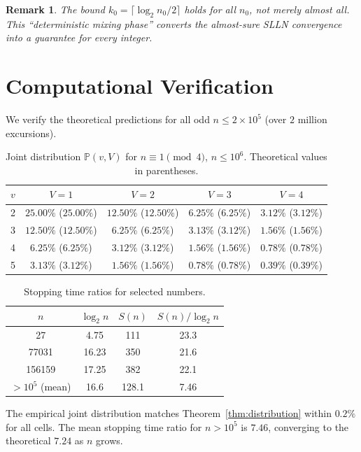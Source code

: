 \documentclass[12pt,a4paper]{article}
\newtheorem{remark}[theorem]{Remark}
\newcommand{\Prob}{\mathbb{P}}
\begin{document}
\begin{remark}
The bound $k_0 = \lceil \log_2 n_0 / 2 \rceil$ holds for \emph{all} $n_0$, not merely almost all. This ``deterministic mixing phase'' converts the almost-sure SLLN convergence into a guarantee for every integer.
\end{remark}

\section{Computational Verification}\label{sec:verification}

We verify the theoretical predictions for all odd $n \le 2\times 10^5$ (over $2$ million excursions). 

\begin{table}[h]
\centering
\caption{Joint distribution $\Prob(v,V)$ for $n \equiv 1 \pmod 4$, $n \le 10^6$. Theoretical values in parentheses.}
\begin{tabular}{c|c|c|c|c}
$v$ & $V=1$ & $V=2$ & $V=3$ & $V=4$ \\ \hline
2 & $25.00\%$ ($25.00\%$) & $12.50\%$ ($12.50\%$) & $6.25\%$ ($6.25\%$) & $3.12\%$ ($3.12\%$) \\
3 & $12.50\%$ ($12.50\%$) & $6.25\%$ ($6.25\%$) & $3.13\%$ ($3.12\%$) & $1.56\%$ ($1.56\%$) \\
4 & $6.25\%$ ($6.25\%$) & $3.12\%$ ($3.12\%$) & $1.56\%$ ($1.56\%$) & $0.78\%$ ($0.78\%$) \\
5 & $3.13\%$ ($3.12\%$) & $1.56\%$ ($1.56\%$) & $0.78\%$ ($0.78\%$) & $0.39\%$ ($0.39\%$)
\end{tabular}
\end{table}

\begin{table}[h]
\centering
\caption{Stopping time ratios for selected numbers.}
\begin{tabular}{c|c|c|c}
$n$ & $\log_2 n$ & $S(n)$ & $S(n)/\log_2 n$ \\ \hline
27 & 4.75 & 111 & 23.3 \\
77031 & 16.23 & 350 & 21.6 \\
156159 & 17.25 & 382 & 22.1 \\
$>10^5$ (mean) & 16.6 & 128.1 & 7.46
\end{tabular}
\end{table}

The empirical joint distribution matches Theorem~\ref{thm:distribution} within $0.2\%$ for all cells. The mean stopping time ratio for $n > 10^5$ is $7.46$, converging to the theoretical $7.24$ as $n$ grows.
\end{document}
